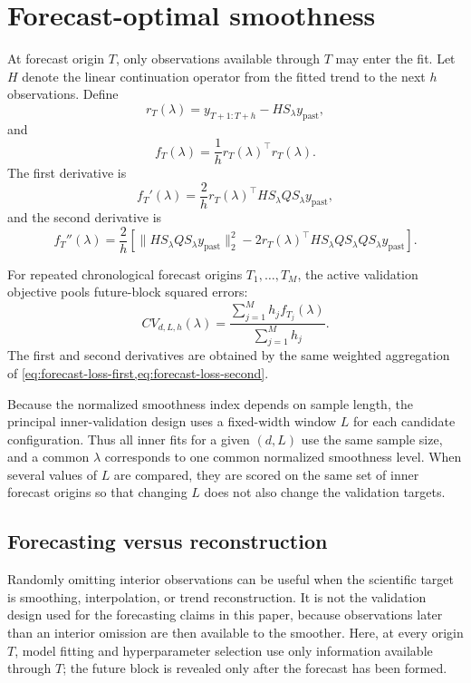 \documentclass[11pt]{article}
\begin{document}
\section{Forecast-optimal smoothness}
At forecast origin $T$, only observations available through $T$ may enter the
fit. Let $H$ denote the linear continuation operator from the fitted trend to
the next $h$ observations. Define
\begin{equation}
\label{eq:forecast-residual}
r_T(\lambda)
=
y_{T+1:T+h}
-
H S_\lambda y_{\mathrm{past}},
\end{equation}
and
\begin{equation}
\label{eq:forecast-loss}
f_T(\lambda)
=
\frac{1}{h}r_T(\lambda)^\top r_T(\lambda).
\end{equation}
The first derivative is
\begin{equation}
\label{eq:forecast-loss-first}
f_T'(\lambda)
=
\frac{2}{h}
r_T(\lambda)^\top
H S_\lambda Q S_\lambda y_{\mathrm{past}},
\end{equation}
and the second derivative is
\begin{equation}
\label{eq:forecast-loss-second}
f_T''(\lambda)
=
\frac{2}{h}
\left[
\|H S_\lambda Q S_\lambda y_{\mathrm{past}}\|_2^2
-
2r_T(\lambda)^\top
H S_\lambda Q S_\lambda Q S_\lambda y_{\mathrm{past}}
\right].
\end{equation}

For repeated chronological forecast origins $T_1,\ldots,T_M$, the active
validation objective pools future-block squared errors:
\begin{equation}
\label{eq:rolling-cv}
CV_{d,L,h}(\lambda)
=
\frac{\sum_{j=1}^M h_j f_{T_j}(\lambda)}
{\sum_{j=1}^M h_j}.
\end{equation}
The first and second derivatives are obtained by the same weighted aggregation
of \cref{eq:forecast-loss-first,eq:forecast-loss-second}.

Because the normalized smoothness index depends on sample length, the principal
inner-validation design uses a fixed-width window $L$ for each candidate
configuration. Thus all inner fits for a given $(d,L)$ use the same sample size,
and a common $\lambda$ corresponds to one common normalized smoothness level.
When several values of $L$ are compared, they are scored on the same set of
inner forecast origins so that changing $L$ does not also change the validation
targets.

\subsection{Forecasting versus reconstruction}
Randomly omitting interior observations can be useful when the scientific
target is smoothing, interpolation, or trend reconstruction. It is not the
validation design used for the forecasting claims in this paper, because
observations later than an interior omission are then available to the
smoother. Here, at every origin $T$, model fitting and hyperparameter selection
use only information available through $T$; the future block is revealed only
after the forecast has been formed.
\end{document}
